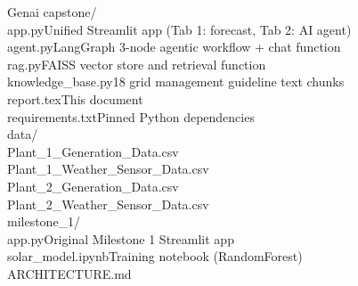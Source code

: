 \documentclass[11pt, a4paper]{article}
\begin{document}
\begin{mdframed}[backgroundcolor=black!5, linewidth=0pt, innerleftmargin=10pt,
                 innertopmargin=8pt, innerbottommargin=8pt]
{\small\ttfamily
\noindent Genai capstone/\\
\hspace*{1em}app.py\hspace{5.5em}Unified Streamlit app (Tab 1: forecast, Tab 2: AI agent)\\
\hspace*{1em}agent.py\hspace{4.6em}LangGraph 3-node agentic workflow + chat function\\
\hspace*{1em}rag.py\hspace{5.6em}FAISS vector store and retrieval function\\
\hspace*{1em}knowledge\_base.py\hspace{0.5em}18 grid management guideline text chunks\\
\hspace*{1em}report.tex\hspace{4em}This document\\
\hspace*{1em}requirements.txt\hspace{2em}Pinned Python dependencies\\
\hspace*{1em}data/\\
\hspace*{2em}Plant\_1\_Generation\_Data.csv\\
\hspace*{2em}Plant\_1\_Weather\_Sensor\_Data.csv\\
\hspace*{2em}Plant\_2\_Generation\_Data.csv\\
\hspace*{2em}Plant\_2\_Weather\_Sensor\_Data.csv\\
\hspace*{1em}milestone\_1/\\
\hspace*{2em}app.py\hspace{3.8em}Original Milestone 1 Streamlit app\\
\hspace*{2em}solar\_model.ipynb\hspace{0.2em}Training notebook (RandomForest)\\
\hspace*{2em}ARCHITECTURE.md\\
}
\end{mdframed}
\end{document}
